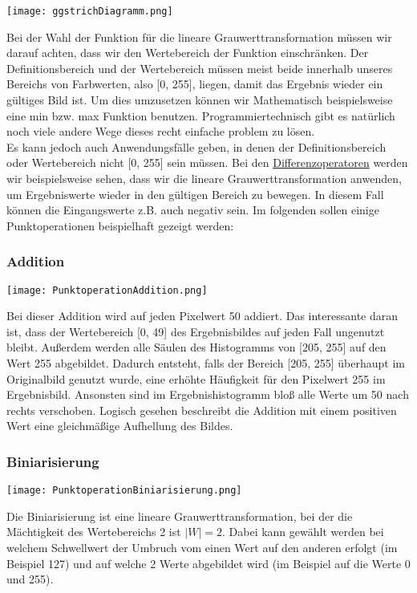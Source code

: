 \texttt{[image: ggstrichDiagramm.png]}

Bei der Wahl der Funktion für die lineare Grauwerttransformation müssen wir darauf achten, dass wir den Wertebereich der Funktion einschränken. Der Definitionsbereich und der Wertebereich müssen meist beide innerhalb unseres Bereichs von Farbwerten, also [0, 255], liegen, damit das Ergebnis wieder ein gültiges Bild ist. Um dies umzusetzen können wir Mathematisch beispielsweise eine min bzw. max Funktion benutzen. Programmiertechnisch gibt es natürlich noch viele andere Wege dieses recht einfache problem zu lösen.\\
Es kann jedoch auch Anwendungsfälle geben, in denen der Definitionsbereich oder Wertebereich nicht [0, 255] sein müssen. Bei den \hyperref[sec:difference-operator]{Differenzoperatoren} werden wir beispielsweise sehen, dass wir die lineare Grauwerttransformation anwenden, um Ergebniswerte wieder in den gültigen Bereich zu bewegen. In diesem Fall können die Eingangswerte z.B. auch negativ sein.
Im folgenden sollen einige Punktoperationen beispielhaft gezeigt werden:\\

\subsubsection{Addition}

\texttt{[image: PunktoperationAddition.png]}

Bei dieser Addition wird auf jeden Pixelwert 50 addiert. Das interessante daran ist, dass der Wertebereich [0, 49] des Ergebnisbildes auf jeden Fall ungenutzt bleibt. Außerdem werden alle Säulen des Histogramms von [205, 255] auf den Wert 255 abgebildet. Dadurch entsteht, falls der Bereich [205, 255] überhaupt im Originalbild genutzt wurde, eine erhöhte Häufigkeit für den Pixelwert 255 im Ergebnisbild. Ansonsten sind im Ergebnishistogramm bloß alle Werte um 50 nach rechts verschoben. Logisch gesehen beschreibt die Addition mit einem positiven Wert eine gleichmäßige Aufhellung des Bildes.

\subsubsection{Biniarisierung}
\label{sec:biniarisierung}

\texttt{[image: PunktoperationBiniarisierung.png]}

Die Biniarisierung ist eine lineare Grauwerttransformation, bei der die Mächtigkeit des Wertebereichs 2 ist $|W| = 2$. Dabei kann gewählt werden bei welchem Schwellwert der Umbruch vom einen Wert auf den anderen erfolgt (im Beispiel 127) und auf welche 2 Werte abgebildet wird (im Beispiel auf die Werte 0 und 255).

